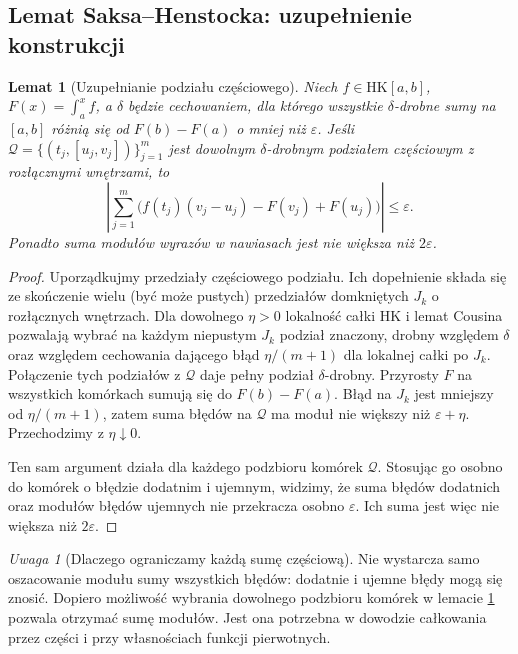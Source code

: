 \documentclass[11pt,a4paper]{article}
\numberwithin{equation}{section}
\theoremstyle{plain}
\newtheorem{lemat}[twierdzenie]{Lemat}
\theoremstyle{definition}
\theoremstyle{remark}
\newtheorem{uwaga}[twierdzenie]{Uwaga}
\newcommand{\HK}{\mathrm{HK}}
\begin{document}
\subsection*{Lemat Saksa--Henstocka: uzupełnienie konstrukcji}
\begin{lemat}[Uzupełnianie podziału częściowego]\label{lem:hk-uzupelnianie}
Niech $f\in\HK[a,b]$, $F(x)=\int_a^x f$, a $\delta$ będzie cechowaniem, dla którego wszystkie $\delta$-drobne sumy na $[a,b]$ różnią się od $F(b)-F(a)$ o mniej niż $\varepsilon$. Jeśli $\mathcal Q=\{(t_j,[u_j,v_j])\}_{j=1}^m$ jest dowolnym $\delta$-drobnym podziałem częściowym z rozłącznymi wnętrzami, to
\[
\left|\sum_{j=1}^m\bigl(f(t_j)(v_j-u_j)-F(v_j)+F(u_j)\bigr)\right|\le\varepsilon.
\]
Ponadto suma modułów wyrazów w nawiasach jest nie większa niż $2\varepsilon$.
\end{lemat}
\begin{proof}
Uporządkujmy przedziały częściowego podziału. Ich dopełnienie składa się ze skończenie wielu (być może pustych) przedziałów domkniętych $J_k$ o rozłącznych wnętrzach. Dla dowolnego $\eta>0$ lokalność całki HK i lemat Cousina pozwalają wybrać na każdym niepustym $J_k$ podział znaczony, drobny względem $\delta$ oraz względem cechowania dającego błąd $\eta/(m+1)$ dla lokalnej całki po $J_k$. Połączenie tych podziałów z $\mathcal Q$ daje pełny podział $\delta$-drobny. Przyrosty $F$ na wszystkich komórkach sumują się do $F(b)-F(a)$. Błąd na $J_k$ jest mniejszy od $\eta/(m+1)$, zatem suma błędów na $\mathcal Q$ ma moduł nie większy niż $\varepsilon+\eta$. Przechodzimy z $\eta\downarrow0$.

Ten sam argument działa dla każdego podzbioru komórek $\mathcal Q$. Stosując go osobno do komórek o błędzie dodatnim i ujemnym, widzimy, że suma błędów dodatnich oraz modułów błędów ujemnych nie przekracza osobno $\varepsilon$. Ich suma jest więc nie większa niż $2\varepsilon$.
\end{proof}
\begin{uwaga}[Dlaczego ograniczamy każdą sumę częściową]
Nie wystarcza samo oszacowanie modułu sumy wszystkich błędów: dodatnie i ujemne błędy mogą się znosić. Dopiero możliwość wybrania dowolnego podzbioru komórek w lemacie \ref{lem:hk-uzupelnianie} pozwala otrzymać sumę modułów. Jest ona potrzebna w dowodzie całkowania przez części i przy własnościach funkcji pierwotnych.
\end{uwaga}
\end{document}
